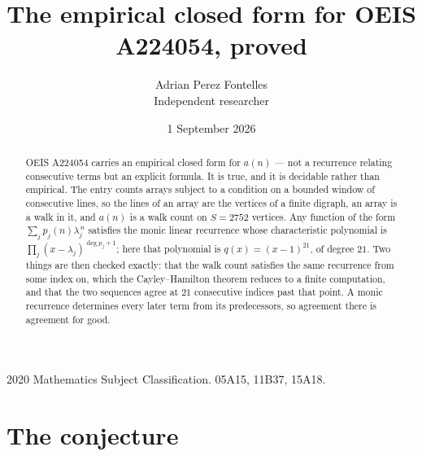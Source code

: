 \documentclass[11pt,a4paper]{article}
\title{The empirical closed form for OEIS A224054, proved}
\author{Adrian Perez Fontelles\\ \small Independent researcher}
\date{1 September 2026}
\theoremstyle{plain}
\theoremstyle{definition}
\begin{document}
\maketitle

\begin{abstract}
OEIS A224054 carries an empirical closed form for $a(n)$ --- not a recurrence relating
consecutive terms but an explicit formula. It is true, and it is decidable rather than
empirical. The entry counts arrays subject to a condition on a bounded window of consecutive lines, so the lines of an array are the
vertices of a finite digraph, an array is a walk in it, and $a(n)$ is a walk count on
$S=2752$ vertices. Any function of the form $\sum_j p_j(n)\lambda_j^{\,n}$ satisfies the
monic linear recurrence whose characteristic polynomial is
$\prod_j(x-\lambda_j)^{\deg p_j+1}$; here that polynomial is $q(x)=(x-1)^{21}$, of degree
$21$. Two things are then checked exactly: that the walk count satisfies the same
recurrence from some index on, which the Cayley--Hamilton theorem reduces to a finite
computation, and that the two sequences agree at $21$ consecutive indices past that
point. A monic recurrence determines every later term from its predecessors, so agreement
there is agreement for good.
\end{abstract}

\noindent\small 2020 Mathematics Subject Classification. 05A15, 11B37, 15A18.\normalsize

\section{The conjecture}
\end{document}
